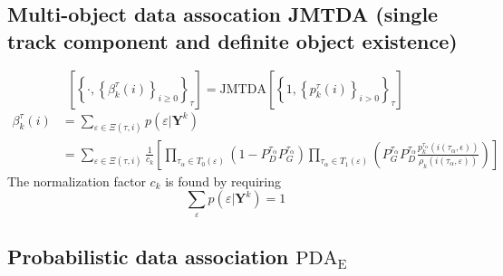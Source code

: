 \subsection{Multi-object data assocation JMTDA (single track component and definite object existence)}\label{sec:JMTDA}

\begin{equation}
    \left[\left\{ \cdot , \left\{\beta_k^\tau(i)\right\}_{i\geq 0}\right\}_\tau\right] = \text{JMTDA}\!\left[\left\{ 1, \left\{ p^\tau_k(i)\right\}_{i>0}\right\}_\tau\right]
\end{equation}
\begin{equation}
    \begin{split}
        \beta^\tau_k (i) &= \sum_{\varepsilon\in \Xi(\tau, i)}p(\varepsilon|\mathbf Y^k)\\
        &=\sum_{\varepsilon \in \Xi(\tau, i)} \frac{1}{c_k} \left[ \prod_{\tau_\alpha\in T_0(\varepsilon)} \left( 1-P_D^{\tau_\alpha} P_G^{\tau_\alpha} \right)\prod_{\tau_\alpha\in T_1(\varepsilon)}\left( P_G^{\tau_\alpha} P_D^{\tau_\alpha} \frac{p_k^{\tau_\alpha}(i(\tau_\alpha, \epsilon))}{\rho_k(i(\tau_\alpha, \varepsilon))} \right)\right]
    \end{split}
\end{equation}
The normalization factor $c_k$ is found by requiring
\begin{equation}
    \sum_{\varepsilon}p(\varepsilon|\mathbf Y^k) = 1
\end{equation}

\subsection{Probabilistic data association \texorpdfstring{$\text{PDA}_\text{E}$}{PDAE}}\label{sec:PDA}

